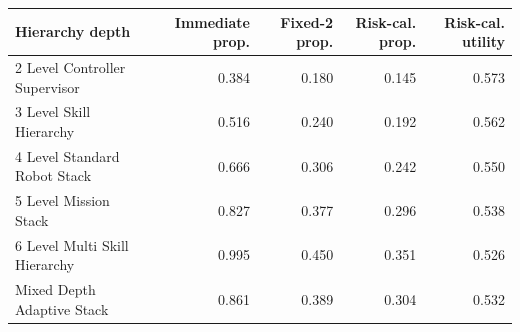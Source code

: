 \begin{tabular}{lrrrr}
\toprule
Hierarchy depth & Immediate prop. & Fixed-2 prop. & Risk-cal. prop. & Risk-cal. utility \\
\midrule
2 Level Controller Supervisor & 0.384 & 0.180 & 0.145 & 0.573 \\
3 Level Skill Hierarchy & 0.516 & 0.240 & 0.192 & 0.562 \\
4 Level Standard Robot Stack & 0.666 & 0.306 & 0.242 & 0.550 \\
5 Level Mission Stack & 0.827 & 0.377 & 0.296 & 0.538 \\
6 Level Multi Skill Hierarchy & 0.995 & 0.450 & 0.351 & 0.526 \\
Mixed Depth Adaptive Stack & 0.861 & 0.389 & 0.304 & 0.532 \\
\bottomrule
\end{tabular}
